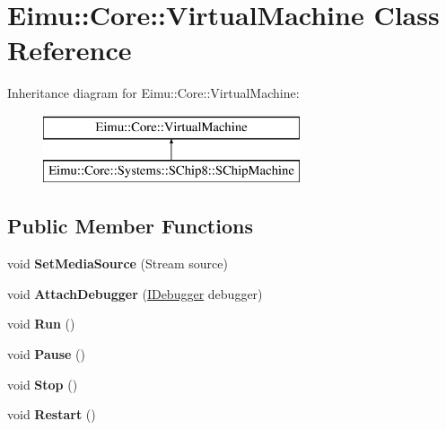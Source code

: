 \hypertarget{class_eimu_1_1_core_1_1_virtual_machine}{
\section{Eimu::Core::VirtualMachine Class Reference}
\label{class_eimu_1_1_core_1_1_virtual_machine}
}
Inheritance diagram for Eimu::Core::VirtualMachine:\begin{figure}[H]
\begin{center}
\leavevmode
\includegraphics[height=2.000000cm]{class_eimu_1_1_core_1_1_virtual_machine}
\end{center}
\end{figure}
\subsection*{Public Member Functions}
\begin{DoxyCompactItemize}
\item 
\hypertarget{class_eimu_1_1_core_1_1_virtual_machine_a1bc2819dcf577a4c01ef661704212071}{
void {\bfseries SetMediaSource} (Stream source)}
\label{class_eimu_1_1_core_1_1_virtual_machine_a1bc2819dcf577a4c01ef661704212071}

\item 
\hypertarget{class_eimu_1_1_core_1_1_virtual_machine_a692b8b9b4c381d4d10442b2e99b3a161}{
void {\bfseries AttachDebugger} (\hyperlink{interface_eimu_1_1_core_1_1_i_debugger}{IDebugger} debugger)}
\label{class_eimu_1_1_core_1_1_virtual_machine_a692b8b9b4c381d4d10442b2e99b3a161}

\item 
\hypertarget{class_eimu_1_1_core_1_1_virtual_machine_a4c78ec008736025cf6543ba387f285ed}{
void {\bfseries Run} ()}
\label{class_eimu_1_1_core_1_1_virtual_machine_a4c78ec008736025cf6543ba387f285ed}

\item 
\hypertarget{class_eimu_1_1_core_1_1_virtual_machine_a46146ebd3fb4d93c639770e2ec487890}{
void {\bfseries Pause} ()}
\label{class_eimu_1_1_core_1_1_virtual_machine_a46146ebd3fb4d93c639770e2ec487890}

\item 
\hypertarget{class_eimu_1_1_core_1_1_virtual_machine_a9b095453d99888ae09b9b01c8b7c7914}{
void {\bfseries Stop} ()}
\label{class_eimu_1_1_core_1_1_virtual_machine_a9b095453d99888ae09b9b01c8b7c7914}

\item 
\hypertarget{class_eimu_1_1_core_1_1_virtual_machine_a619f33839db52669767b3c58268aea63}{
void {\bfseries Restart} ()}
\label{class_eimu_1_1_core_1_1_virtual_machine_a619f33839db52669767b3c58268aea63}

\end{DoxyCompactItemize}
